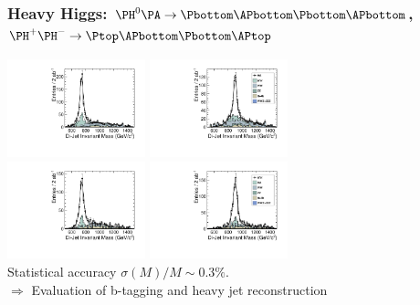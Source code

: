 \documentclass{beamer}
\begin{document}
\begin{frame}
\frametitle{Heavy Higgs: $\PH^0\PA\to\Pbottom\APbottom\Pbottom\APbottom$,
$\PH^+\PH^-\to\Ptop\APbottom\Pbottom\APtop$}
\centering
\includegraphics[width=4cm]{HAMass742_Bkg_CKFM_00BX_FJ.pdf}
\includegraphics[width=4cm]{HAMass902_Bkg_CKFM_00BX_FJ.pdf}\\
\includegraphics[width=4cm]{Hpm_Mass742_Bkg_CKFM_00BX_FJ.pdf}
\includegraphics[width=4cm]{Hpm_Mass902_Bkg_CKFM_00BX_FJ.pdf}\\
{\scriptsize Statistical accuracy $\sigma(M)/M \sim0.3\%$.}\\
$\Rightarrow$ Evaluation of b-tagging and heavy jet reconstruction
\end{frame}
\end{document}

